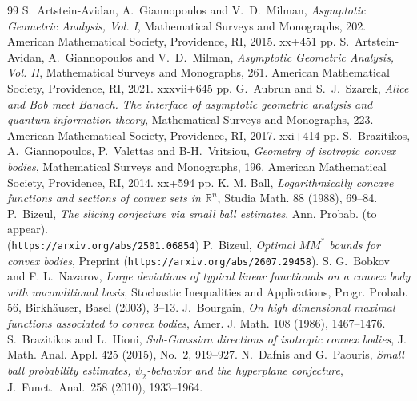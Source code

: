 \documentclass[10pt,a4paper]{amsart}
\numberwithin{equation}{section}
\begin{document}
\begin{thebibliography}{99}
 \textrm{S.\ Artstein-Avidan, A.\ Giannopoulos and V.\ D.\ Milman}, \textit{Asymptotic Geometric Analysis, Vol. I}, Mathematical Surveys and Monographs, 202. American Mathematical Society, Providence, RI, 2015. xx+451 pp.
 \textrm{S.\ Artstein-Avidan, A.\ Giannopoulos and V.\ D.\ Milman}, \textit{Asymptotic Geometric Analysis, Vol. II}, Mathematical Surveys and Monographs, 261. American Mathematical Society, Providence, RI, 2021. xxxvii+645 pp.
 \textrm{G.~Aubrun and S.~J.~Szarek}, \textit{Alice and Bob meet Banach. The interface of asymptotic geometric analysis and quantum information theory}, Mathematical Surveys and Monographs, 223. American Mathematical Society, Providence, RI, 2017. xxi+414 pp.
 \textrm{S.\ Brazitikos, A.\ Giannopoulos, P.\ Valettas and B-H.\ Vritsiou}, \textit{Geometry of isotropic convex bodies}, Mathematical Surveys and Monographs, 196. American Mathematical Society, Providence, RI, 2014. xx+594 pp.
 \textrm{K. M. Ball}, \textit{Logarithmically concave functions and sections of convex sets in ${\mathbb{R}}^n$}, Studia Math. {88} (1988), 69--84.
 \textrm{P.\ Bizeul}, \textit{The slicing conjecture via small ball estimates}, Ann. Probab. (to appear).\\ ({\tt https://arxiv.org/abs/2501.06854})
 \textrm{P.\ Bizeul}, \textit{Optimal $MM^{\ast}$ bounds for convex bodies}, Preprint ({\tt https://arxiv.org/abs/2607.29458}).
 \textrm{S. G.\ Bobkov and F. L.\ Nazarov}, \textit{Large deviations of typical linear functionals on a convex body with unconditional basis}, Stochastic Inequalities and Applications, Progr. Probab. {56}, Birkh\"{a}user, Basel (2003), 3--13.
 \textrm{J.\ Bourgain}, \textit{On high dimensional maximal functions associated to convex bodies}, Amer. J. Math. {108} (1986), 1467--1476.
 \textrm{S.~Brazitikos and L.~Hioni}, \textit{Sub-Gaussian directions of isotropic convex bodies}, J. Math. Anal. Appl. 425 (2015), No.~2, 919--927.
 \textrm{N.\ Dafnis and G.\ Paouris}, \textit{Small ball probability estimates, $\psi_2$-behavior and the hyperplane conjecture}, J.\ Funct.\ Anal.\ {258} (2010), 1933--1964.

\end{thebibliography}
\end{document}
